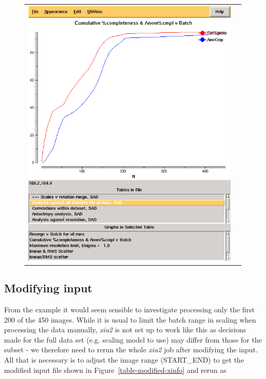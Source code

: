 \documentclass[a4paper, 11pt]{article}
\begin{document}
\begin{figure}
\begin{tabular}{cc}
\includegraphics[scale=0.25]{figures/3qrn-all-complete-aimless.png} \\
\end{tabular}
\end{figure}

\subsection{Modifying input}

From the example it would seem sensible to investigate processing only the
first 200 of the 450 images. While it is usual to limit the batch range in 
scaling when processing the data manually, \emph{xia2} is not set up to 
work like this as decisions made for the full data set (e.g. scaling model
to use) may differ from those for the subset - we therefore need to rerun the
whole \emph{xia2} job after modifying the input. All that is necessary is to 
adjust the image range (START\_END) to get the modified input file shown in 
Figure~\ref{table-modified-xinfo} and rerun as 
\end{document}

